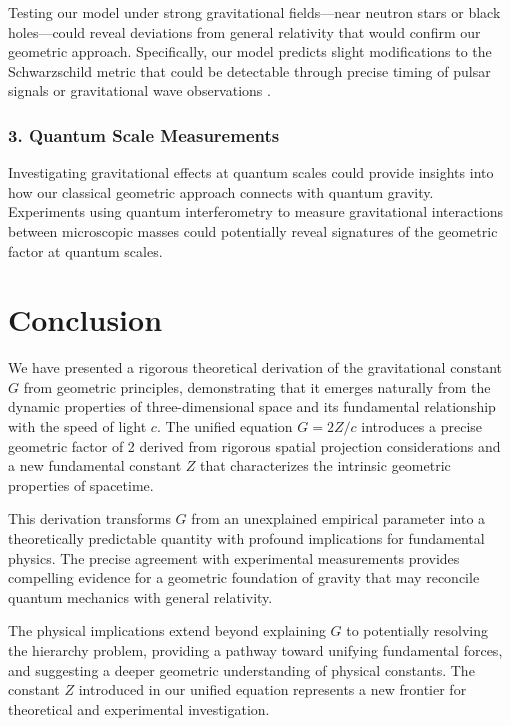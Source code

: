 \documentclass[12pt]{article}
\numberwithin{equation}{section}
\begin{document}
Testing our model under strong gravitational fields—near neutron stars or black holes—could reveal deviations from general relativity that would confirm our geometric approach. Specifically, our model predicts slight modifications to the Schwarzschild metric that could be detectable through precise timing of pulsar signals or gravitational wave observations \citep{will2014}.

\subsubsection{3. Quantum Scale Measurements}

Investigating gravitational effects at quantum scales could provide insights into how our classical geometric approach connects with quantum gravity. Experiments using quantum interferometry to measure gravitational interactions between microscopic masses \citep{geraci2013} could potentially reveal signatures of the geometric factor at quantum scales.

\section{Conclusion}
\label{sec:conclusion}

We have presented a rigorous theoretical derivation of the gravitational constant $G$ from geometric principles, demonstrating that it emerges naturally from the dynamic properties of three-dimensional space and its fundamental relationship with the speed of light $c$. The unified equation $G = 2Z/c$ introduces a precise geometric factor of 2 derived from rigorous spatial projection considerations and a new fundamental constant $Z$ that characterizes the intrinsic geometric properties of spacetime.

This derivation transforms $G$ from an unexplained empirical parameter into a theoretically predictable quantity with profound implications for fundamental physics. The precise agreement with experimental measurements provides compelling evidence for a geometric foundation of gravity that may reconcile quantum mechanics with general relativity.

The physical implications extend beyond explaining $G$ to potentially resolving the hierarchy problem, providing a pathway toward unifying fundamental forces, and suggesting a deeper geometric understanding of physical constants. The constant $Z$ introduced in our unified equation represents a new frontier for theoretical and experimental investigation.
\end{document}
